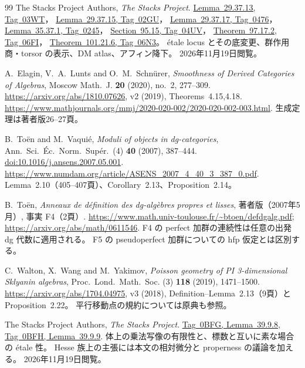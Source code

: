 \documentclass[11pt,a4paper]{ltjsarticle}
\numberwithin{equation}{section}
\begin{document}
\begin{thebibliography}{99}
The Stacks Project Authors, \emph{The Stacks Project}.
\href{https://stacks.math.columbia.edu/tag/03WT}{Lemma~29.37.13, Tag~03WT}，
\href{https://stacks.math.columbia.edu/tag/02GU}{Lemma~29.37.15, Tag~02GU}，
\href{https://stacks.math.columbia.edu/tag/0476}{Lemma~29.37.17, Tag~0476}，
\href{https://stacks.math.columbia.edu/tag/0245}{Lemma~35.37.1, Tag~0245}，
\href{https://stacks.math.columbia.edu/tag/04UV}{Section~95.15, Tag~04UV}，
\href{https://stacks.math.columbia.edu/tag/06FI}{Theorem~97.17.2, Tag~06FI}，
\href{https://stacks.math.columbia.edu/tag/06N3}{Theorem~101.21.6, Tag~06N3}。
étale locus とその底変更、群作用商・torsor の表示、DM atlas、アフィン降下。
2026年11月19日閲覧。

A.~Elagin, V.~A.~Lunts and O.~M.~Schn\"urer,
\emph{Smoothness of Derived Categories of Algebras},
Moscow Math.~J. \textbf{20} (2020), no.~2, 277--309.
\url{https://arxiv.org/abs/1810.07626}, v2 (2019), Theorems~4.15,4.18.
\url{https://www.mathjournals.org/mmj/2020-020-002/2020-020-002-003.html}.
生成定理は著者版26--27頁。

B.~To\"en and M.~Vaqui\'e,
\emph{Moduli of objects in dg-categories},
Ann.~Sci.~\'Ec.~Norm.~Sup\'er.~(4) \textbf{40} (2007), 387--444.
\href{https://doi.org/10.1016/j.ansens.2007.05.001}{doi:10.1016/j.ansens.2007.05.001}.
\url{https://www.numdam.org/article/ASENS_2007_4_40_3_387_0.pdf}.
Lemma~2.10（405--407頁）、Corollary~2.13、Proposition~2.14。

B.~To\"en,
\emph{Anneaux de d\'efinition des dg-alg\`ebres propres et lisses},
著者版（2007年5月）, 事実 F4（2頁）.
\url{https://www.math.univ-toulouse.fr/~btoen/defdgalg.pdf};
\url{https://arxiv.org/abs/math/0611546}.
F4 の perfect 加群の連続性は任意の出発 dg 代数に適用される。
F5 の pseudoperfect 加群についての hfp 仮定とは区別する。

C.~Walton, X.~Wang and M.~Yakimov,
\emph{Poisson geometry of PI 3-dimensional Sklyanin algebras},
Proc.~Lond.~Math.~Soc. (3) \textbf{118} (2019), 1471--1500.
\url{https://arxiv.org/abs/1704.04975}, v3 (2018),
Definition--Lemma~2.13（9頁）と Proposition~2.22。
平行移動点の規約については原典\cite{ATV}も参照。

The Stacks Project Authors, \emph{The Stacks Project}.
\href{https://stacks.math.columbia.edu/tag/0BFG}{Tag~0BFG, Lemma~39.9.8},
\href{https://stacks.math.columbia.edu/tag/0BFH}{Tag~0BFH, Lemma~39.9.9}.
体上の乗法写像の有限性と、標数と互いに素な場合の \'etale 性。
Hesse 族上の主張には本文の相対微分と properness の議論を加える。
2026年11月19日閲覧。


\end{thebibliography}
\end{document}
